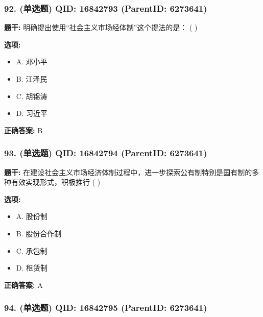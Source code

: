 \documentclass[12pt,UTF8]{ctexart}
\begin{document}
\subsubsection*{92. (单选题) \small QID: 16842793 (ParentID: 6273641)}

\textbf{题干:}
明确提出使用“社会主义市场经体制”这个提法的是：  ( )



\textbf{选项:}
\begin{itemize}[leftmargin=*]

  \item A. 邓小平

  \item B. 江泽民

  \item C. 胡锦涛

  \item D. 习近平

\end{itemize}

\textbf{正确答案:}
B

\vspace{0.3em}\hrulefill\vspace{0.7em}

\subsubsection*{93. (单选题) \small QID: 16842794 (ParentID: 6273641)}

\textbf{题干:}
在建设社会主义市场经济体制过程中，进一步探索公有制特别是国有制的多种有效实现形式，积极推行 ( )



\textbf{选项:}
\begin{itemize}[leftmargin=*]

  \item A. 股份制

  \item B. 股份合作制

  \item C. 承包制

  \item D. 租赁制

\end{itemize}

\textbf{正确答案:}
A

\vspace{0.3em}\hrulefill\vspace{0.7em}

\subsubsection*{94. (单选题) \small QID: 16842795 (ParentID: 6273641)}
\end{document}

